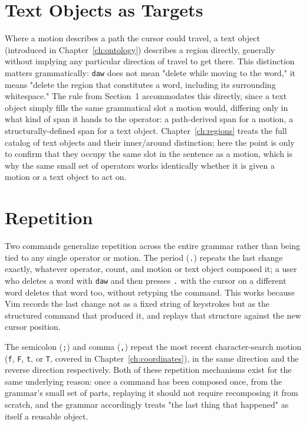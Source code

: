 \section{Text Objects as Targets}

Where a motion describes a path the cursor could travel, a text object (introduced in Chapter~\ref{ch:ontology}) describes a region directly, generally without implying any particular direction of travel to get there. This distinction matters grammatically: \texttt{daw} does not mean "delete while moving to the word," it means "delete the region that constitutes a word, including its surrounding whitespace." The rule from Section~1 accommodates this directly, since a text object simply fills the same grammatical slot a motion would, differing only in what kind of span it hands to the operator: a path-derived span for a motion, a structurally-defined span for a text object. Chapter~\ref{ch:regions} treats the full catalog of text objects and their inner/around distinction; here the point is only to confirm that they occupy the same slot in the sentence as a motion, which is why the same small set of operators works identically whether it is given a motion or a text object to act on.

\section{Repetition}

Two commands generalize repetition across the entire grammar rather than being tied to any single operator or motion. The period (\texttt{.}) repeats the last change exactly, whatever operator, count, and motion or text object composed it; a user who deletes a word with \texttt{daw} and then presses \texttt{.} with the cursor on a different word deletes that word too, without retyping the command. This works because Vim records the last change not as a fixed string of keystrokes but as the structured command that produced it, and replays that structure against the new cursor position.

The semicolon (\texttt{;}) and comma (\texttt{,}) repeat the most recent character-search motion (\texttt{f}, \texttt{F}, \texttt{t}, or \texttt{T}, covered in Chapter~\ref{ch:coordinates}), in the same direction and the reverse direction respectively. Both of these repetition mechanisms exist for the same underlying reason: once a command has been composed once, from the grammar's small set of parts, replaying it should not require recomposing it from scratch, and the grammar accordingly treats "the last thing that happened" as itself a reusable object.

